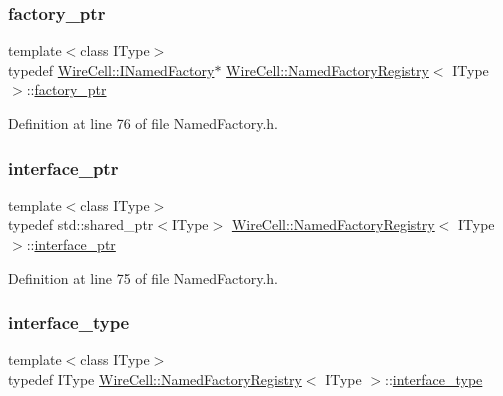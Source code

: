 \subsubsection{\texorpdfstring{factory\+\_\+ptr}{factory\_ptr}}
{\footnotesize\ttfamily template$<$class I\+Type$>$ \\
typedef \hyperlink{class_wire_cell_1_1_i_named_factory}{Wire\+Cell\+::\+I\+Named\+Factory}$\ast$ \hyperlink{class_wire_cell_1_1_named_factory_registry}{Wire\+Cell\+::\+Named\+Factory\+Registry}$<$ I\+Type $>$\+::\hyperlink{class_wire_cell_1_1_named_factory_registry_a4d693bf86f7a8a24ac7dc00d92d929cf}{factory\+\_\+ptr}}



Definition at line 76 of file Named\+Factory.\+h.

\mbox{\label{class_wire_cell_1_1_named_factory_registry_a1098a42a84d98eae7cdb3cc9a0602e38}} 
\subsubsection{\texorpdfstring{interface\+\_\+ptr}{interface\_ptr}}
{\footnotesize\ttfamily template$<$class I\+Type$>$ \\
typedef std\+::shared\+\_\+ptr$<$I\+Type$>$ \hyperlink{class_wire_cell_1_1_named_factory_registry}{Wire\+Cell\+::\+Named\+Factory\+Registry}$<$ I\+Type $>$\+::\hyperlink{class_wire_cell_1_1_named_factory_registry_a1098a42a84d98eae7cdb3cc9a0602e38}{interface\+\_\+ptr}}



Definition at line 75 of file Named\+Factory.\+h.

\mbox{\label{class_wire_cell_1_1_named_factory_registry_aece4420d1fa924bd430e5fc8f2d43066}} 
\subsubsection{\texorpdfstring{interface\+\_\+type}{interface\_type}}
{\footnotesize\ttfamily template$<$class I\+Type$>$ \\
typedef I\+Type \hyperlink{class_wire_cell_1_1_named_factory_registry}{Wire\+Cell\+::\+Named\+Factory\+Registry}$<$ I\+Type $>$\+::\hyperlink{class_wire_cell_1_1_named_factory_registry_aece4420d1fa924bd430e5fc8f2d43066}{interface\+\_\+type}}



